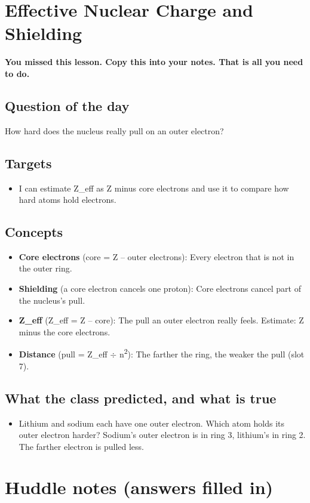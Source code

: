 \documentclass[11pt]{article}
\begin{document}
\section*{Effective Nuclear Charge and Shielding}
\textbf{You missed this lesson. Copy this into your notes. That is all you need to do.}\par\medskip
\subsection*{Question of the day}
How hard does the nucleus really pull on an outer electron?\par
\subsection*{Targets}\begin{itemize}\item I can estimate Z\_eff as Z minus core electrons and use it to compare how hard atoms hold electrons.\end{itemize}
\subsection*{Concepts}\begin{itemize}
\item \textbf{Core electrons} (core = Z -- outer electrons): Every electron that is not in the outer ring.
\item \textbf{Shielding} (a core electron cancels one proton): Core electrons cancel part of the nucleus's pull.
\item \textbf{Z\_eff} (Z\_eff = Z -- core): The pull an outer electron really feels. Estimate: Z minus the core electrons.
\item \textbf{Distance} (pull = Z\_eff $\div$ n\textsuperscript{2}): The farther the ring, the weaker the pull (slot 7).
\end{itemize}
\subsection*{What the class predicted, and what is true}\begin{itemize}
\item Lithium and sodium each have one outer electron. Which atom holds its outer electron harder?  Sodium's outer electron is in ring 3, lithium's in ring 2. The farther electron is pulled less.
\end{itemize}
\section*{Huddle notes (answers filled in)}
\end{document}
